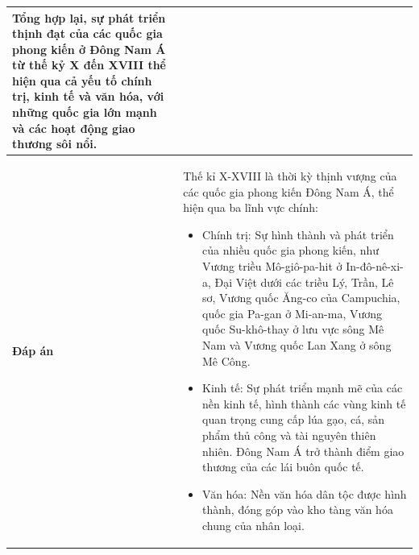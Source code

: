 \begin{table}[ht]
{{\begin{tabular}{|p{3cm}|p{10cm}|}
                Tổng hợp lại, sự phát triển thịnh đạt của các quốc gia phong kiến ở Đông Nam Á từ thế kỷ X đến XVIII thể hiện qua cả yếu tố chính trị, kinh tế và văn hóa, với những quốc gia lớn mạnh và các hoạt động giao thương sôi nổi.                                                                                             \\
                \hline
                \textbf{Đáp án}      & Thế kỉ X-XVIII là thời kỳ thịnh vượng của các quốc gia phong kiến Đông Nam Á, thể hiện qua ba lĩnh vực chính:
                \begin{itemize}
                    \item Chính trị: Sự hình thành và phát triển của nhiều quốc gia phong kiến, như Vương triều Mô-giô-pa-hit ở In-đô-nê-xi-a, Đại Việt dưới các triều Lý, Trần, Lê sơ, Vương quốc Ăng-co của Campuchia, quốc gia Pa-gan ở Mi-an-ma, Vương quốc Su-khô-thay ở lưu vực sông Mê Nam và Vương quốc Lan Xang ở sông Mê Công.
                    \item Kinh tế: Sự phát triển mạnh mẽ của các nền kinh tế, hình thành các vùng kinh tế quan trọng cung cấp lúa gạo, cá, sản phẩm thủ công và tài nguyên thiên nhiên. Đông Nam Á trở thành điểm giao thương của các lái buôn quốc tế.
                    \item Văn hóa: Nền văn hóa dân tộc được hình thành, đóng góp vào kho tàng văn hóa chung của nhân loại.
                \end{itemize}      \\
                \hline
            \end{tabular}}
    }
    \label{tab:open_question_2}
\end{table}
